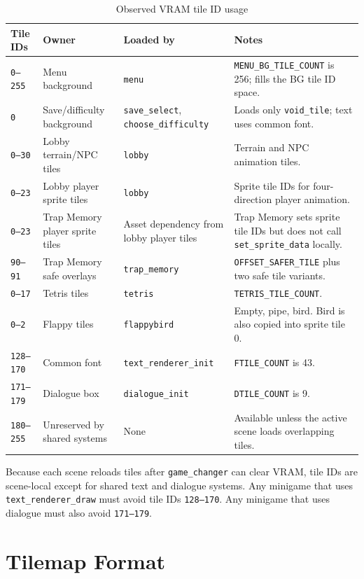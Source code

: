 \begin{table}[h]
\centering
\small
\begin{tabular}{p{2.3cm}p{3.2cm}p{3.4cm}p{5.0cm}}
\toprule
\textbf{Tile IDs} & \textbf{Owner} & \textbf{Loaded by} & \textbf{Notes} \\
\midrule
\texttt{0--255} & Menu background & \texttt{menu} & \texttt{MENU\_BG\_TILE\_COUNT} is 256; fills the BG tile ID space. \\
\texttt{0} & Save/difficulty background & \texttt{save\_select}, \texttt{choose\_difficulty} & Loads only \texttt{void\_tile}; text uses common font. \\
\texttt{0--30} & Lobby terrain/NPC tiles & \texttt{lobby} & Terrain and NPC animation tiles. \\
\texttt{0--23} & Lobby player sprite tiles & \texttt{lobby} & Sprite tile IDs for four-direction player animation. \\
\texttt{0--23} & Trap Memory player sprite tiles & Asset dependency from lobby player tiles & Trap Memory sets sprite tile IDs but does not call \texttt{set\_sprite\_data} locally. \\
\texttt{90--91} & Trap Memory safe overlays & \texttt{trap\_memory} & \texttt{OFFSET\_SAFER\_TILE} plus two safe tile variants. \\
\texttt{0--17} & Tetris tiles & \texttt{tetris} & \texttt{TETRIS\_TILE\_COUNT}. \\
\texttt{0--2} & Flappy tiles & \texttt{flappybird} & Empty, pipe, bird. Bird is also copied into sprite tile 0. \\
\texttt{128--170} & Common font & \texttt{text\_renderer\_init} & \texttt{FTILE\_COUNT} is 43. \\
\texttt{171--179} & Dialogue box & \texttt{dialogue\_init} & \texttt{DTILE\_COUNT} is 9. \\
\texttt{180--255} & Unreserved by shared systems & None & Available unless the active scene loads overlapping tiles. \\
\bottomrule
\end{tabular}
\caption{Observed VRAM tile ID usage}
\end{table}

Because each scene reloads tiles after \texttt{game\_changer} can clear VRAM, tile IDs are scene-local except for shared text and dialogue systems. Any minigame that uses \texttt{text\_renderer\_draw} must avoid tile IDs \texttt{128--170}. Any minigame that uses dialogue must also avoid \texttt{171--179}.

\section{Tilemap Format}

